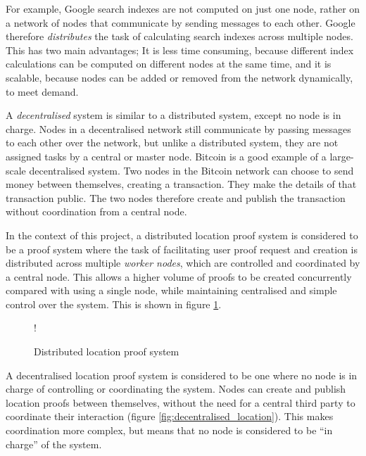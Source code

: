 For example, Google search indexes are not computed on just one node, rather on a network of nodes that communicate by sending messages to each other. Google therefore \textit{distributes} the task of calculating search indexes across multiple nodes. This has two main advantages; It is less time consuming, because different index calculations can be computed on different nodes at the same time, and it is scalable, because nodes can be added or removed from the network dynamically, to meet demand.

A \textit{decentralised} system is similar to a distributed system, except no node is in charge. Nodes in a decentralised network still communicate by passing messages to each other over the network, but unlike a distributed system, they are not assigned tasks by a central or master node. Bitcoin \cite{bitcoin} is a good example of a large-scale decentralised system. Two nodes in the Bitcoin network can choose to send money between themselves, creating a transaction. They make the details of that transaction public. The two nodes therefore create and publish the transaction without coordination from a central node.

In the context of this project, a distributed location proof system is considered to be a proof system where the task of facilitating user proof request and creation is distributed across multiple \textit{worker nodes}, which are controlled and coordinated by a central node. This allows a higher volume of proofs to be created concurrently compared with using a single node, while maintaining centralised and simple control over the system. This is shown in figure \ref{fig:distributed_location}.

\begin{figure}[H]
\begin{center}
 {!} {}
\end{center}
\caption{Distributed location proof system}
\label{fig:distributed_location}
\end{figure}

A decentralised location proof system is considered to be one where no node is in charge of controlling or coordinating the system. Nodes can create and publish location proofs between themselves, without the need for a central third party to coordinate their interaction (figure \ref{fig:decentralised_location}). This makes coordination more complex, but means that no node is considered to be ``in charge'' of the system.

